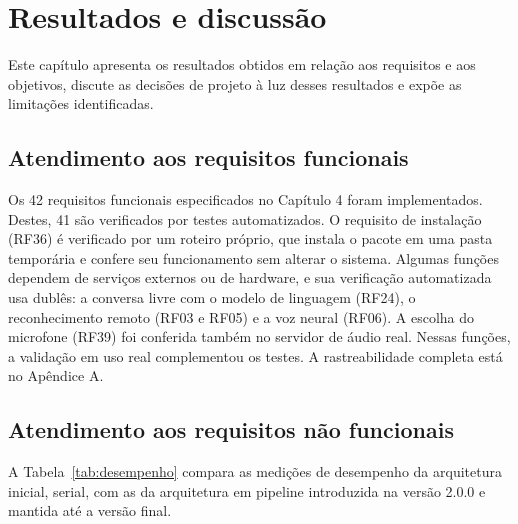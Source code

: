 \chapter{Resultados e discussão}

Este capítulo apresenta os resultados obtidos em relação aos requisitos e aos objetivos, discute as
decisões de projeto à luz desses resultados e expõe as limitações identificadas.

\section{Atendimento aos requisitos funcionais}

Os 42 requisitos funcionais especificados no Capítulo 4 foram implementados. Destes, 41 são
verificados por testes automatizados. O requisito de instalação (RF36) é verificado por um roteiro
próprio, que instala o pacote em uma pasta temporária e confere seu funcionamento sem alterar o
sistema. Algumas funções dependem de serviços externos ou de hardware, e sua verificação automatizada
usa dublês: a conversa livre com o modelo de linguagem (RF24), o reconhecimento remoto (RF03 e RF05) e
a voz neural (RF06). A escolha do microfone (RF39) foi conferida também no servidor de áudio real.
Nessas funções, a validação em uso real complementou os testes. A rastreabilidade
completa está no Apêndice A.

\section{Atendimento aos requisitos não funcionais}

A Tabela~\ref{tab:desempenho} compara as medições de desempenho da arquitetura inicial, serial, com as
da arquitetura em pipeline introduzida na versão 2.0.0 e mantida até a versão final.


